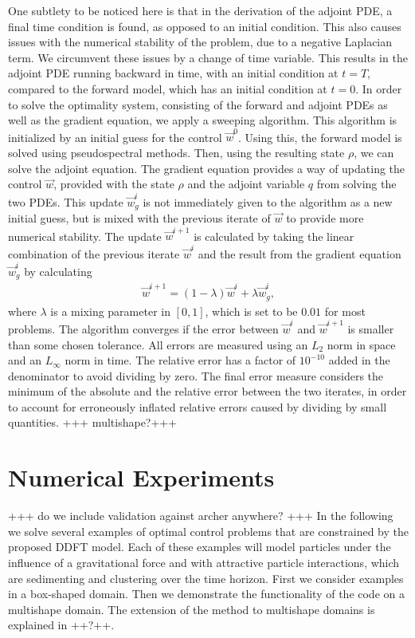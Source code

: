 \documentclass[final]{siamltex}
\newcommand{\adj}{q}
\newcommand{\w}{\vec{w}}
\begin{document}
One subtlety to be noticed here is that in the derivation of the adjoint PDE, a final time condition is found, as opposed to an initial condition. This also causes issues with the numerical stability of the problem, due to a negative Laplacian term. We circumvent these issues by a change of time variable. This results in the adjoint PDE running backward in time, with an initial condition at $t = T$, compared to the forward model, which has an initial condition at $t = 0$. 
In order to solve the optimality system, consisting of the forward and adjoint PDEs as well as the gradient equation, we apply a sweeping algorithm.
This algorithm is initialized by an initial guess for the control $\w^0$. Using this, the forward model is solved using pseudospectral methods. Then, using the resulting state $\rho$, we can solve the adjoint equation. The gradient equation provides a way of updating the control $\w$, provided with the state $\rho$ and the adjoint variable $\adj$ from solving the two PDEs. This update $\w^{i}_g$ is not immediately given to the algorithm as a new initial guess, but is mixed with the previous iterate of $\w$ to provide more numerical stability. The update $\w^{i+1}$ is calculated by taking the linear combination of the previous iterate $\w^{i}$ and the result from the gradient equation $\w^{i}_g$ by calculating
\begin{align*}
	\w^{i+1} = (1 - \lambda) \w^{i} + \lambda \w^{i}_g,
\end{align*}
where $\lambda$ is a mixing parameter in $[0,1]$, which is set to be $0.01$ for most problems.
The algorithm converges if the error between $\w^{i}$ and $\w^{i+1}$ is smaller than some chosen tolerance. All errors are measured using an $L_2$ norm in space and an $L_\infty$ norm in time. The relative error has a factor of $10^{-10}$ added in the denominator to avoid dividing by zero. The final error measure considers the minimum of the absolute and the relative error between the two iterates, in order to account for erroneously inflated relative errors caused by dividing by small quantities.
+++ multishape?+++
\section{Numerical Experiments}\label{sec:Expts}
+++ do we include validation against archer anywhere? +++
In the following we solve several examples of optimal control problems that are constrained by the proposed DDFT model. Each of these examples will model particles under the influence of a gravitational force and with attractive particle interactions, which are sedimenting and clustering over the time horizon. First we consider examples in a box-shaped domain. Then we demonstrate the functionality of the code on a multishape domain. The extension of the method to multishape domains is explained in ++?++.
\end{document}

